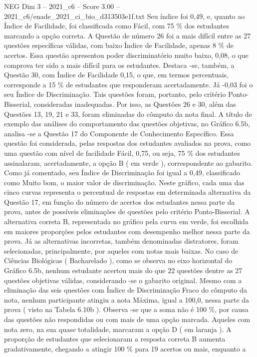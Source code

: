 \begin{textsample}{NEG Dim 3 – 2021\_c6 – Score 3.00 – 2021\_c6/enade\_2021\_ci\_bio\_d313503e1f.txt}
Seu índice foi 0,49, e, quanto ao Índice de Facilidade, foi classificada como Fácil, com 75 \% dos estudantes marcando a opção correta.
A Questão de número 26 foi a mais difícil entre as 27 questões específicas válidas, com baixo Índice de Facilidade, apenas 8 \% de acertos.
Essa questão apresentou poder discriminatório muito baixo, 0,08, o que comprova ter sido a mais difícil para os estudantes.
Destaca -se, também, a Questão 30, com Índice de Facilidade 0,15, o que, em termos percentuais, corresponde a 15 \% de estudantes que responderam acertadamente.
Já -0,03 foi o seu Índice de Discriminação.
Tais questões foram, portanto, pelo critério Ponto-Bisserial, consideradas inadequadas.
Por isso, as Questões 26 e 30, além das Questões 13, 19, 21 e 33, foram eliminadas do cômputo da nota final.
A título de exemplo das análises do comportamento das questões objetivas, no Gráfico 6.5b, analisa -se a Questão 17 do Componente de Conhecimento Específico.
Essa questão foi considerada, pelas respostas dos estudantes avaliados na prova, como uma questão com nível de facilidade Fácil, 0,75, ou seja, 75 \% dos estudantes assinalaram, acertadamente, a opção B ( em verde ), correspondente ao gabarito.
Como já comentado, seu Índice de Discriminação foi igual a 0,49, classificado como Muito bom, o maior valor de discriminação.
Neste gráfico, cada uma das cinco curvas representa o percentual de respostas em determinada alternativa da Questão 17, em função do número de acertos dos estudantes nessa parte da prova, antes de possíveis eliminações de questões pelo critério Ponto-Bisserial.
A alternativa correta B, representada no gráfico pela curva em verde, foi escolhida em maiores proporções pelos estudantes com desempenho melhor nessa parte da prova.
Já as alternativas incorretas, também denominadas distratores, foram selecionadas, principalmente, por aqueles com notas mais baixas.
No caso de Ciências Biológicas ( Bacharelado ), como se observa no eixo horizontal do Gráfico 6.5b, nenhum estudante acertou mais do que 22 questões dentre as 27 questões objetivas válidas, considerando -se o gabarito original.
Mesmo com a eliminação das seis questões com Índice de Discriminação Fraco do cômputo da nota, nenhum participante atingiu a nota Máxima, igual a 100,0, nessa parte da prova ( visto na Tabela 6.10b ).
Observa -se que a soma não é 100 \%, por causa das questões não respondidas ou com mais de uma opção marcada.
Aqueles com nota zero, na sua quase totalidade, marcaram a opção D ( em laranja ).
A proporção de estudantes que selecionaram a resposta correta B aumenta gradativamente, chegando a atingir 100 \% para 19 acertos ou mais, enquanto a

\end{textsample}
